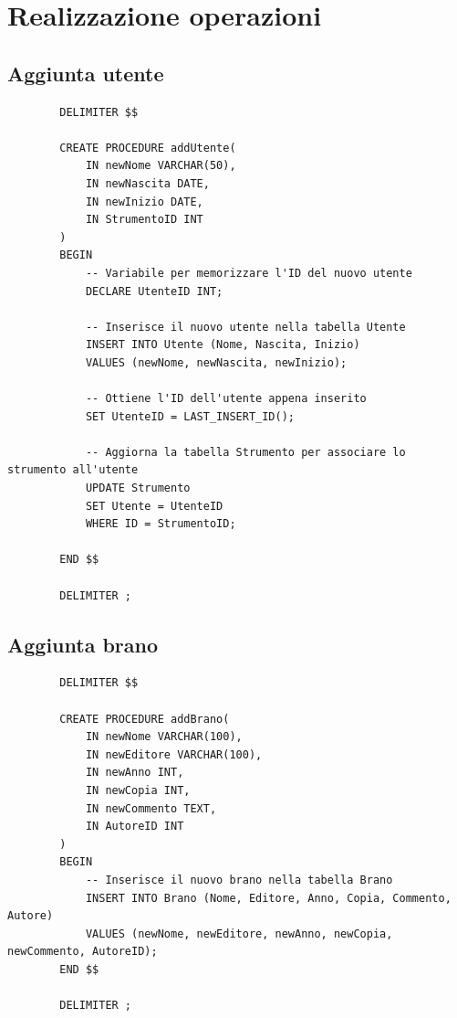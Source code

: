 \documentclass{article}
\begin{document}
    \section{Realizzazione operazioni}
    
    \subsection{Aggiunta utente}
    
    \begin{verbatim}
        DELIMITER $$

        CREATE PROCEDURE addUtente(
            IN newNome VARCHAR(50),
            IN newNascita DATE,
            IN newInizio DATE,
            IN StrumentoID INT
        )
        BEGIN
            -- Variabile per memorizzare l'ID del nuovo utente
            DECLARE UtenteID INT;

            -- Inserisce il nuovo utente nella tabella Utente
            INSERT INTO Utente (Nome, Nascita, Inizio)
            VALUES (newNome, newNascita, newInizio);

            -- Ottiene l'ID dell'utente appena inserito
            SET UtenteID = LAST_INSERT_ID();

            -- Aggiorna la tabella Strumento per associare lo strumento all'utente
            UPDATE Strumento
            SET Utente = UtenteID
            WHERE ID = StrumentoID;

        END $$

        DELIMITER ;
    \end{verbatim}
    
    \subsection{Aggiunta brano}
    
    \begin{verbatim}
        DELIMITER $$

        CREATE PROCEDURE addBrano(
            IN newNome VARCHAR(100),
            IN newEditore VARCHAR(100),
            IN newAnno INT,
            IN newCopia INT,
            IN newCommento TEXT,
            IN AutoreID INT
        )
        BEGIN
            -- Inserisce il nuovo brano nella tabella Brano
            INSERT INTO Brano (Nome, Editore, Anno, Copia, Commento, Autore)
            VALUES (newNome, newEditore, newAnno, newCopia, newCommento, AutoreID);
        END $$

        DELIMITER ;
    \end{verbatim}
\end{document}

